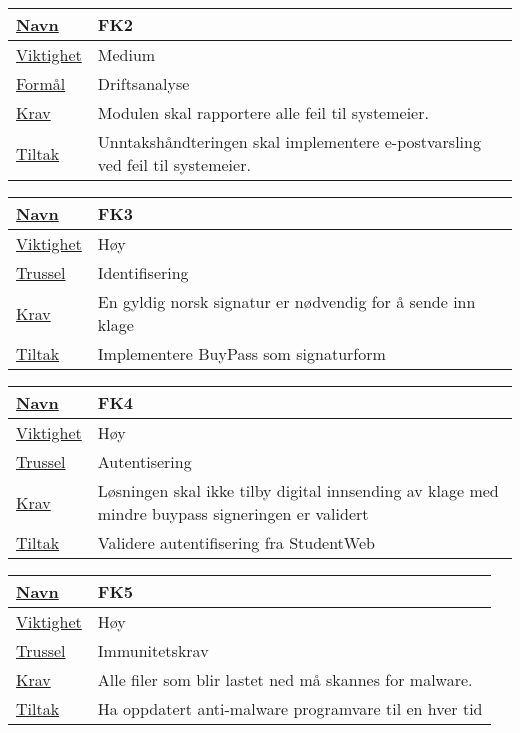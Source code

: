 \begin{tabularx}{\textwidth}{|l|X|}
  \hline
  \underline{Navn} & FK2 \\ \hline
  \underline{Viktighet} & Medium \\ \hline
  \underline{Formål} & Driftsanalyse \\ \hline
  \underline{Krav} & Modulen skal rapportere alle feil til systemeier. \\ \hline
  \underline{Tiltak} & Unntakshåndteringen skal implementere e-postvarsling ved feil til systemeier. \\ \hline
\end{tabularx}

\begin{tabularx}{\textwidth}{|l|X|}
  \hline
  \underline{Navn} & FK3 \\ \hline
  \underline{Viktighet} & Høy \\ \hline
  \underline{Trussel} & Identifisering \\ \hline
  \underline{Krav} & En gyldig norsk signatur er nødvendig for å sende inn klage \\ \hline
  \underline{Tiltak} & Implementere BuyPass som signaturform \\ \hline
\end{tabularx}

\begin{tabularx}{\textwidth}{|l|X|}
  \hline
  \underline{Navn} & FK4 \\ \hline
  \underline{Viktighet} & Høy \\ \hline
  \underline{Trussel} & Autentisering \\ \hline
  \underline{Krav} & Løsningen skal ikke tilby digital innsending av klage med mindre buypass signeringen er validert \\ \hline
  \underline{Tiltak} & Validere autentifisering fra StudentWeb \\ \hline
\end{tabularx}

\begin{tabularx}{\textwidth}{|l|X|}
  \hline
  \underline{Navn} & FK5 \\ \hline
  \underline{Viktighet} & Høy \\ \hline
  \underline{Trussel} & Immunitetskrav \\ \hline
  \underline{Krav} & Alle filer som blir lastet ned må skannes for malware. \\ \hline
  \underline{Tiltak} & Ha oppdatert anti-malware programvare til en hver tid \\ \hline
\end{tabularx}

